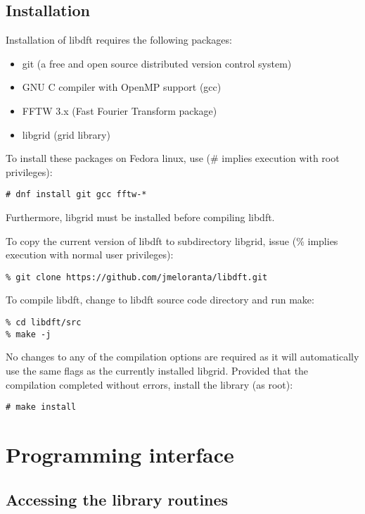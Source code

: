 \documentclass[12pt,letterpaper]{report}
\begin{document}



\section{Installation}

Installation of libdft requires the following packages:
\begin{itemize}
\item git (a free and open source distributed version control system)
\item GNU C compiler with OpenMP support (gcc)
\item FFTW 3.x (Fast Fourier Transform package)
\item libgrid (grid library)
\end{itemize}
To install these packages on Fedora linux, use (\# implies execution with root privileges): 
\begin{verbatim}
# dnf install git gcc fftw-*
\end{verbatim}
Furthermore, libgrid must be installed before compiling libdft.

To copy the current version of libdft to subdirectory libgrid, issue 
(\% implies execution with normal user privileges):
\begin{verbatim}
% git clone https://github.com/jmeloranta/libdft.git
\end{verbatim}
To compile libdft, change to libdft source code directory and run make:
\begin{verbatim}
% cd libdft/src
% make -j
\end{verbatim}
No changes to any of the compilation options are required as it will 
automatically use the same flags as the currently installed libgrid.
Provided that the compilation completed without errors, install the library 
(as root):
\begin{verbatim}
# make install
\end{verbatim}

\chapter{Programming interface}

\section{Accessing the library routines}
\end{document}
